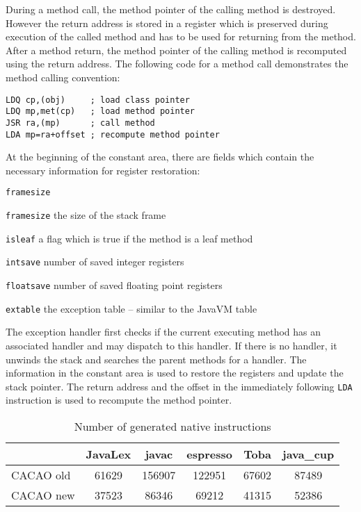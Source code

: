 During a method call, the method pointer of the calling method is
destroyed. However the return address is stored in a register which is
preserved during execution of the called method and has to be used for
returning from the method. After a method return, the method pointer
of the calling method is recomputed using the return address. The
following code for a method call demonstrates the method calling
convention:

\begin{verbatim}
LDQ cp,(obj)     ; load class pointer
LDQ mp,met(cp)   ; load method pointer
JSR ra,(mp)      ; call method
LDA mp=ra+offset ; recompute method pointer
\end{verbatim}

At the beginning of the constant area, there are fields which contain
the necessary information for register restoration:

\begin{mylist}{{\tt framesize}}
\item[{\tt framesize}] the size of the stack frame
\item[{\tt isleaf}]    a flag which is true if the method is a leaf
method
\item[{\tt intsave}]   number of saved integer registers
\item[{\tt floatsave}] number of saved floating point registers
\item[{\tt extable}]   the exception table -- similar to the JavaVM
table
\end{mylist}

The exception handler first checks if the current executing method has
an associated handler and may dispatch to this handler. If there is no
handler, it unwinds the stack and searches the parent methods for a
handler. The information in the constant area is used to restore the
registers and update the stack pointer. The return address and the
offset in the immediately following {\tt LDA} instruction is used to
recompute the method pointer.

\begin{table*}
\begin{center}
\begin{tabular}[b]{|l|c|c|c|c|c|}
\hline 
          & JavaLex & javac  & espresso & Toba  & java\_cup \\ \hline
CACAO old &  61629  & 156907 &  122951  & 67602 &   87489   \\ \hline
CACAO new &  37523  &  86346 &   69212  & 41315 &   52386   \\ \hline
\end{tabular}
\caption{Number of generated native instructions}
\label{CodeSize}
\end{center}
\end{table*}

